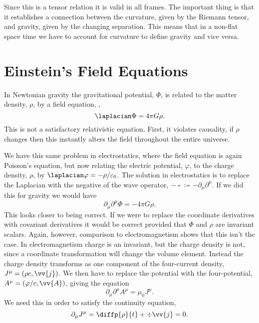 \documentclass[fleqn]{NotesClass}
\newcommand*{\dalembertian}{\mathop{\square}}
\begin{document}
    Since this is a tensor relation it is valid in all frames.
    The important thing is that it establishes a connection between the curvature, given by the Riemann tensor, and gravity, given by the changing separation.
    This means that in a non-flat space time we have to account for curvature to define gravity and vice versa.
    
    \section{Einstein's Field Equations}
    In Newtonian gravity the gravitational potential, \(\Phi\), is related to the matter density, \(\rho\), by a field equation, ,
    \begin{equation}
        \laplacian\Phi = 4\pi G\rho.
    \end{equation}
    This is not a satisfactory relativistic equation.
    First, it violates causality, if \(\rho\) changes then this instantly alters the field throughout the entire universe.
    
    We have this same problem in electrostatics, where the field equation is again Poisson's equation, but now relating the electric potential, \(\varphi\), to the charge density, \(\rho\), by \(\laplacian \varphi = -\rho/\varepsilon_0\).
    The solution in electrostatics is to replace the Laplacian with the negative of the wave operator, \(-\dalembertian \coloneqq -\partial_\mu\partial^\mu\).
    If we did this for gravity we would have
    \begin{equation}
        \partial_\mu\partial^\mu \Phi = -4\pi G\rho.
    \end{equation}
    This looks closer to being correct.
    If we were to replace the coordinate derivatives with covariant derivatives it would be correct provided that \(\Phi\) and \(\rho\) are invariant scalars.
    Again, however, comparison to electromagnetism shows that this isn't the case.
    In electromagnetism charge is an invariant, but the charge density is not, since a coordinate transformation will change the volume element.
    Instead the charge density transforms as one component of the four-current density, \(J^\mu = (\rho c, \vv{j})\).
    We then have to replace the potential with the four-potential, \(A^\mu = (\varphi/c, \vv{A})\), giving the equation
    \begin{equation}
        \partial_\mu \partial^\mu A^\mu = \mu_0 J^\mu.
    \end{equation}
    We need this in order to satisfy the continuity equation,
    \begin{equation}
        \partial_\mu J^\mu = \diffp{\rho}{t} + \div\vv{j} = 0.
    \end{equation}
    
\end{document}
